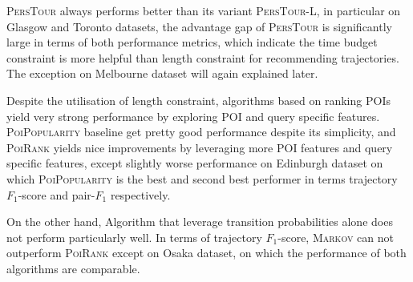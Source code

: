 \textsc{PersTour}\cite{ijcai15} always performs better than its variant \textsc{PersTour-L},
in particular on Glasgow and Toronto datasets, the advantage gap of \textsc{PersTour}
is significantly large in terms of both performance metrics,
%
which indicate the time budget constraint is more helpful than length constraint for recommending trajectories.
The exception on Melbourne dataset will again explained later.

Despite the utilisation of length constraint, algorithms based on ranking POIs yield very strong performance
by exploring POI and query specific features.
%
\textsc{PoiPopularity} baseline get pretty good performance despite its simplicity,
and \textsc{PoiRank} yields nice improvements by leveraging more POI features and query specific features,
except slightly worse performance on Edinburgh dataset on which \textsc{PoiPopularity} is the best and
second best performer in terms trajectory $F_1$-score and pair-$F_1$ respectively.

On the other hand, Algorithm that leverage transition probabilities alone does not perform particularly well.
%
In terms of trajectory $F_1$-score,
\textsc{Markov} can not outperform \textsc{PoiRank} except on Osaka dataset,
on which the performance of both algorithms are comparable.

